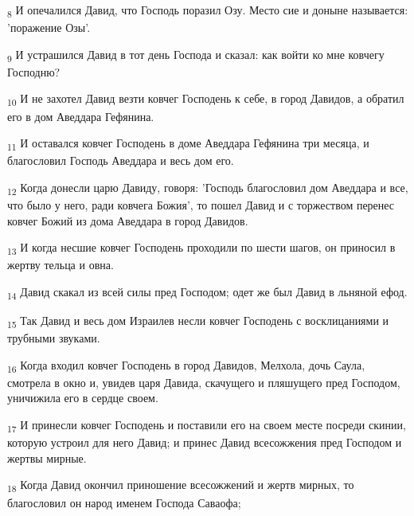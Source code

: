 \begin{tcolorbox}
\textsubscript{8} И опечалился Давид, что Господь поразил Озу. Место сие и доныне называется: 'поражение Озы'.
\end{tcolorbox}
\begin{tcolorbox}
\textsubscript{9} И устрашился Давид в тот день Господа и сказал: как войти ко мне ковчегу Господню?
\end{tcolorbox}
\begin{tcolorbox}
\textsubscript{10} И не захотел Давид везти ковчег Господень к себе, в город Давидов, а обратил его в дом Аведдара Гефянина.
\end{tcolorbox}
\begin{tcolorbox}
\textsubscript{11} И оставался ковчег Господень в доме Аведдара Гефянина три месяца, и благословил Господь Аведдара и весь дом его.
\end{tcolorbox}
\begin{tcolorbox}
\textsubscript{12} Когда донесли царю Давиду, говоря: 'Господь благословил дом Аведдара и все, что было у него, ради ковчега Божия', то пошел Давид и с торжеством перенес ковчег Божий из дома Аведдара в город Давидов.
\end{tcolorbox}
\begin{tcolorbox}
\textsubscript{13} И когда несшие ковчег Господень проходили по шести шагов, он приносил в жертву тельца и овна.
\end{tcolorbox}
\begin{tcolorbox}
\textsubscript{14} Давид скакал из всей силы пред Господом; одет же был Давид в льняной ефод.
\end{tcolorbox}
\begin{tcolorbox}
\textsubscript{15} Так Давид и весь дом Израилев несли ковчег Господень с восклицаниями и трубными звуками.
\end{tcolorbox}
\begin{tcolorbox}
\textsubscript{16} Когда входил ковчег Господень в город Давидов, Мелхола, дочь Саула, смотрела в окно и, увидев царя Давида, скачущего и пляшущего пред Господом, уничижила его в сердце своем.
\end{tcolorbox}
\begin{tcolorbox}
\textsubscript{17} И принесли ковчег Господень и поставили его на своем месте посреди скинии, которую устроил для него Давид; и принес Давид всесожжения пред Господом и жертвы мирные.
\end{tcolorbox}
\begin{tcolorbox}
\textsubscript{18} Когда Давид окончил приношение всесожжений и жертв мирных, то благословил он народ именем Господа Саваофа;
\end{tcolorbox}
